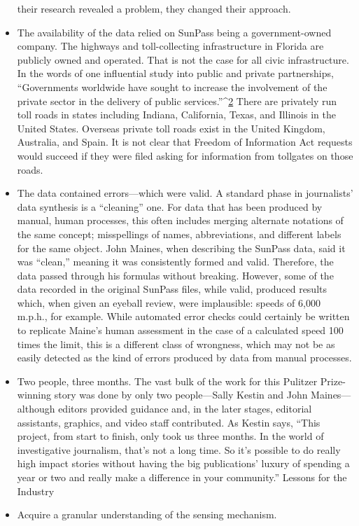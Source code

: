 \begin{itemize}
their research revealed a problem, they changed their approach.
\item The availability of the data relied on SunPass being a
government-owned company.
The highways and toll-collecting infrastructure in Florida are publicly
owned and operated. That is not the case for all civic infrastructure. In
the words of one influential study into public and private partnerships,
``Governments worldwide have sought to increase the involvement
of the private sector in the delivery of public services.''^{\href{#endnotes-sun-sentinel}{2}} There
are privately run toll roads in states including Indiana, California,
Texas, and Illinois in the United States. Overseas private toll roads
exist in the United Kingdom, Australia, and Spain. It is not clear that
Freedom of Information Act requests would succeed if they were filed
asking for information from tollgates on those roads.
\item The data contained errors—which were valid.
A standard phase in journalists' data synthesis is a ``cleaning'' one.
For data that has been produced by manual, human processes, this
often includes merging alternate notations of the same concept; misspellings
of names, abbreviations, and different labels for the same
object. John Maines, when describing the SunPass data, said it was
``clean,'' meaning it was consistently formed and valid. Therefore, the
data passed through his formulas without breaking. However, some
of the data recorded in the original SunPass files, while valid, produced
results which, when given an eyeball review, were implausible:
speeds of 6,000 m.p.h., for example. While automated error checks
could certainly be written to replicate Maine's human assessment in
the case of a calculated speed 100 times the limit, this is a different
class of wrongness, which may not be as easily detected as the kind of
errors produced by data from manual processes.
\item Two people, three months.
The vast bulk of the work for this Pulitzer Prize-winning story was done
by only two people—Sally Kestin and John Maines—although editors
provided guidance and, in the later stages, editorial assistants, graphics,
and video staff contributed. As Kestin says, ``This project, from
start to finish, only took us three months. In the world of investigative
journalism, that's not a long time. So it's possible to do really high
impact stories without having the big publications' luxury of spending
a year or two and really make a difference in your community.''
Lessons for the Industry
\item Acquire a granular understanding of the sensing mechanism.

\end{itemize}
